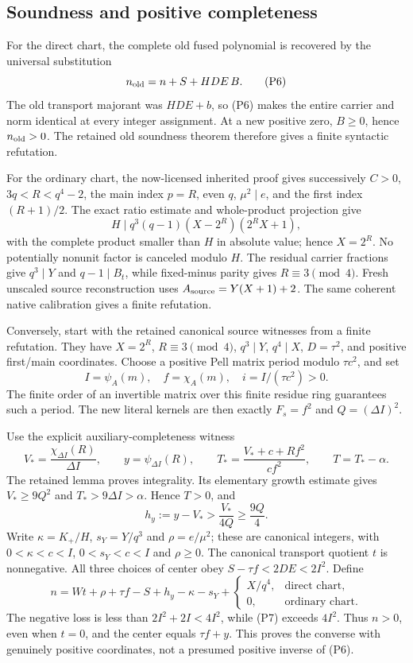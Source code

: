 \subsection{Soundness and positive completeness}
For the direct chart, the complete old fused polynomial is recovered by the universal substitution
\[
 n_{\rm old}=n+S+HDE\,B. \tag{P6}
\]
The old transport majorant was $HDE+b$, so (P6) makes the entire carrier and norm identical at every integer assignment. At a new positive zero, $B\ge0$, hence $n_{\rm old}>0$. The retained old soundness theorem therefore gives a finite syntactic refutation.

For the ordinary chart, the now-licensed inherited proof gives successively $C>0$, $3q<R<q^4-2$, the main index $p=R$, even $q$, $\mu^2\mid e$, and the first index $(R+1)/2$. The exact ratio estimate and whole-product projection give
\[
 H\mid q^3(q-1)(X-2^R)(2^RX+1),
\]
with the complete product smaller than $H$ in absolute value; hence $X=2^R$. No potentially nonunit factor is canceled modulo $H$. The residual carrier fractions give $q^3\mid Y$ and $q-1\mid B_t$, while fixed-minus parity gives $R\equiv3\pmod4$. Fresh unscaled source reconstruction uses $A_{\rm source}=Y(X+1)+2$. The same coherent native calibration gives a finite refutation.

Conversely, start with the retained canonical source witnesses from a finite refutation. They have $X=2^R$, $R\equiv3\pmod4$, $q^3\mid Y$, $q^4\mid X$, $D=\tau^2$, and positive first/main coordinates. Choose a positive Pell matrix period modulo $\tau c^2$, and set
\[
 I=\psi_A(m),\quad f=\chi_A(m),\quad
 i=I/(\tau c^2)>0.
\]
The finite order of an invertible matrix over this finite residue ring guarantees such a period. The new literal kernels are then exactly $F_s=f^2$ and $Q=(\Delta I)^2$.

Use the explicit auxiliary-completeness witness
\[
 V_*=\frac{\chi_{\Delta I}(R)}{\Delta I},\qquad
 y=\psi_{\Delta I}(R),\qquad
 T_*=\frac{V_*+c+Rf^2}{cf^2},\qquad T=T_*-\alpha.
\]
The retained lemma proves integrality. Its elementary growth estimate gives $V_*\ge9Q^2$ and $T_*>9\Delta I>\alpha$. Hence $T>0$, and
\[
 h_y:=y-V_*>\frac{V_*}{4Q}\ge\frac{9Q}{4}. \tag{P7}
\]
Write $\kappa=K_+/H$, $s_Y=Y/q^3$ and $\rho=e/\mu^2$; these are canonical integers, with $0<\kappa<c<I$, $0<s_Y<c<I$ and $\rho\ge0$. The canonical transport quotient $t$ is nonnegative. All three choices of center obey $S-\tau f<2DE<2I^2$. Define
\[
 n=Wt+\rho+\tau f-S+h_y-\kappa-s_Y
       +\begin{cases}X/q^4,&\text{direct chart},\\0,&\text{ordinary chart}.\end{cases}
\]
The negative loss is less than $2I^2+2I<4I^2$, while (P7) exceeds $4I^2$. Thus $n>0$, even when $t=0$, and the center equals $\tau f+y$. This proves the converse with genuinely positive coordinates, not a presumed positive inverse of (P6).

